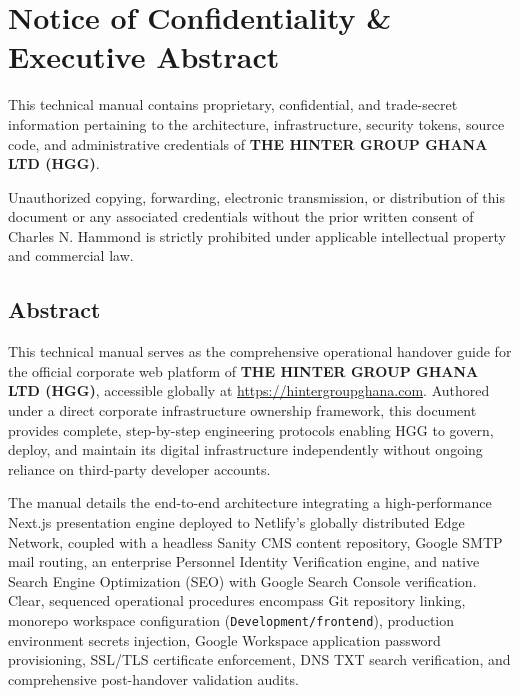 \documentclass[11pt,a4paper,oneside]{book}
\begin{document}
\frontmatter
\pagestyle{plain}

\chapter*{Notice of Confidentiality \& Executive Abstract}

\begin{confidentialbox}
This technical manual contains proprietary, confidential, and trade-secret information pertaining to the architecture, infrastructure, security tokens, source code, and administrative credentials of \textbf{THE HINTER GROUP GHANA LTD (HGG)}. 

Unauthorized copying, forwarding, electronic transmission, or distribution of this document or any associated credentials without the prior written consent of Charles N. Hammond is strictly prohibited under applicable intellectual property and commercial law.
\end{confidentialbox}

\vspace{0.6cm}

\section*{Abstract}
This technical manual serves as the comprehensive operational handover guide for the official corporate web platform of \textbf{THE HINTER GROUP GHANA LTD (HGG)}, accessible globally at \url{https://hintergroupghana.com}. Authored under a direct corporate infrastructure ownership framework, this document provides complete, step-by-step engineering protocols enabling HGG to govern, deploy, and maintain its digital infrastructure independently without ongoing reliance on third-party developer accounts.

The manual details the end-to-end architecture integrating a high-performance Next.js presentation engine deployed to Netlify's globally distributed Edge Network, coupled with a headless Sanity CMS content repository, Google SMTP mail routing, an enterprise Personnel Identity Verification engine, and native Search Engine Optimization (SEO) with Google Search Console verification. Clear, sequenced operational procedures encompass Git repository linking, monorepo workspace configuration (\texttt{Development/frontend}), production environment secrets injection, Google Workspace application password provisioning, SSL/TLS certificate enforcement, DNS TXT search verification, and comprehensive post-handover validation audits.
\end{document}
